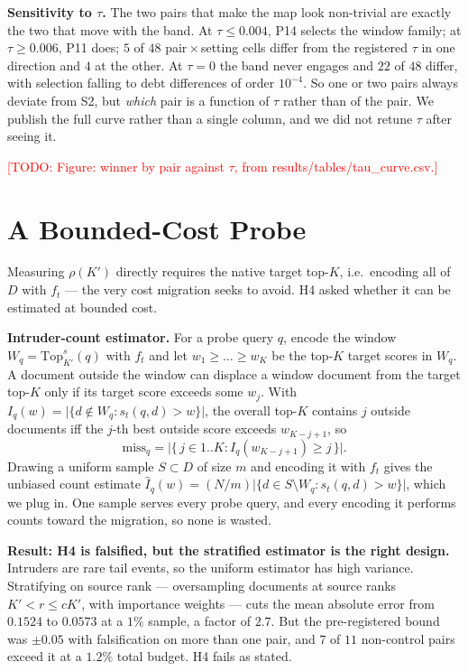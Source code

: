 \documentclass[conference]{IEEEtran}
\newcommand{\todo}[1]{\textcolor{red}{[TODO: #1]}}
\newcommand{\topk}{\mathrm{Top}}
\newcommand{\win}{W}
\newcommand{\debt}{\mathrm{debt}}
\begin{document}
\textbf{Sensitivity to $\tau$.} The two pairs that make the map look non-trivial are
exactly the two that move with the band. At $\tau \le 0.004$, P14 selects the window
family; at $\tau \ge 0.006$, P11 does; $5$ of $48$ pair\,$\times$\,setting cells differ
from the registered $\tau$ in one direction and $4$ at the other. At $\tau = 0$ the band
never engages and $22$ of $48$ differ, with selection falling to $\debt$ differences of
order $10^{-4}$. So one or two pairs always deviate from S2, but \emph{which} pair is a
function of $\tau$ rather than of the pair. We publish the full curve rather than a single
column, and we did not retune $\tau$ after seeing it.

\todo{Figure: winner by pair against $\tau$, from results/tables/tau\_curve.csv.}

\section{A Bounded-Cost Probe}\label{sec:probe}

Measuring $\rho(K')$ directly requires the native target top-$K$, i.e.\ encoding all of
$D$ with $f_t$ --- the very cost migration seeks to avoid. H4 asked whether it can be
estimated at bounded cost.

\textbf{Intruder-count estimator.} For a probe query $q$, encode the window
$\win_q = \topk_{K'}^{s}(q)$ with $f_t$ and let $w_1 \ge \dots \ge w_K$ be the top-$K$
target scores in $\win_q$. A document outside the window can displace a window document
from the target top-$K$ only if its target score exceeds some $w_j$. With
$I_q(w) = \lvert\{d\notin\win_q : s_t(q,d) > w\}\rvert$, the overall top-$K$ contains $j$
outside documents iff the $j$-th best outside score exceeds $w_{K-j+1}$, so
\[
\mathrm{miss}_q = \bigl\lvert\{\, j \in 1..K : I_q(w_{K-j+1}) \ge j \,\}\bigr\rvert .
\]
Drawing a uniform sample $S\subset D$ of size $m$ and encoding it with $f_t$ gives the
unbiased count estimate $\hat I_q(w) = (N/m)\lvert\{d \in S\setminus \win_q : s_t(q,d) >
w\}\rvert$, which we plug in. One sample serves every probe query, and every encoding it
performs counts toward the migration, so none is wasted.

\textbf{Result: H4 is falsified, but the stratified estimator is the right design.}
Intruders are rare tail events, so the uniform estimator has high variance. Stratifying
on source rank --- oversampling documents at source ranks $K' < r \le cK'$, with
importance weights --- cuts the mean absolute error from $0.1524$ to $0.0573$ at a $1\%$
sample, a factor of $2.7$. But the pre-registered bound was $\pm 0.05$ with falsification
on more than one pair, and $7$ of $11$ non-control pairs exceed it at a $1.2\%$ total
budget. H4 fails as stated.
\end{document}
